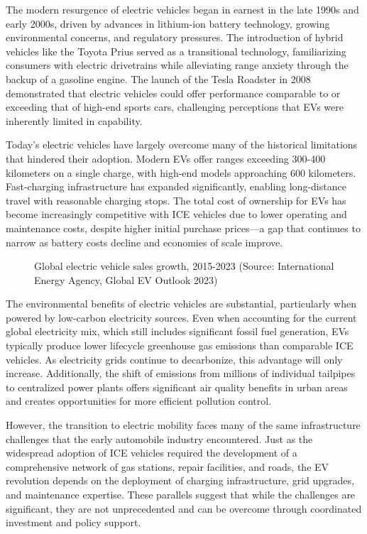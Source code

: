 The modern resurgence of electric vehicles began in earnest in the late 1990s and early 2000s, driven by advances in lithium-ion battery technology, growing environmental concerns, and regulatory pressures. The introduction of hybrid vehicles like the Toyota Prius served as a transitional technology, familiarizing consumers with electric drivetrains while alleviating range anxiety through the backup of a gasoline engine. The launch of the Tesla Roadster in 2008 demonstrated that electric vehicles could offer performance comparable to or exceeding that of high-end sports cars, challenging perceptions that EVs were inherently limited in capability.

Today's electric vehicles have largely overcome many of the historical limitations that hindered their adoption. Modern EVs offer ranges exceeding 300-400 kilometers on a single charge, with high-end models approaching 600 kilometers. Fast-charging infrastructure has expanded significantly, enabling long-distance travel with reasonable charging stops. The total cost of ownership for EVs has become increasingly competitive with ICE vehicles due to lower operating and maintenance costs, despite higher initial purchase prices—a gap that continues to narrow as battery costs decline and economies of scale improve.

\begin{figure}[h]
    \centering
    \caption{Global electric vehicle sales growth, 2015-2023 (Source: International Energy Agency, Global EV Outlook 2023)}
    \label{fig:ev-growth}
\end{figure}

The environmental benefits of electric vehicles are substantial, particularly when powered by low-carbon electricity sources. Even when accounting for the current global electricity mix, which still includes significant fossil fuel generation, EVs typically produce lower lifecycle greenhouse gas emissions than comparable ICE vehicles. As electricity grids continue to decarbonize, this advantage will only increase. Additionally, the shift of emissions from millions of individual tailpipes to centralized power plants offers significant air quality benefits in urban areas and creates opportunities for more efficient pollution control.

However, the transition to electric mobility faces many of the same infrastructure challenges that the early automobile industry encountered. Just as the widespread adoption of ICE vehicles required the development of a comprehensive network of gas stations, repair facilities, and roads, the EV revolution depends on the deployment of charging infrastructure, grid upgrades, and maintenance expertise. These parallels suggest that while the challenges are significant, they are not unprecedented and can be overcome through coordinated investment and policy support.

